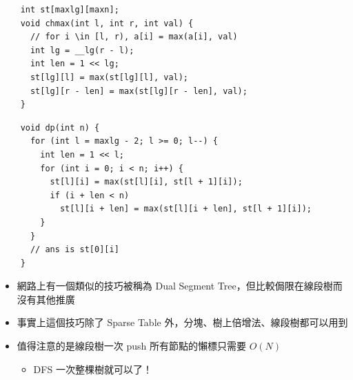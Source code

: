 \documentclass[standalone]{beamer}
\begin{document}
\begin{frame}[fragile]{}
  \begin{verbatim}
    int st[maxlg][maxn];
    void chmax(int l, int r, int val) {
      // for i \in [l, r), a[i] = max(a[i], val)
      int lg = __lg(r - l);
      int len = 1 << lg;
      st[lg][l] = max(st[lg][l], val);
      st[lg][r - len] = max(st[lg][r - len], val);
    }
  \end{verbatim}
\end{frame}

\begin{frame}[fragile]{}
  \begin{verbatim}
    void dp(int n) {
      for (int l = maxlg - 2; l >= 0; l--) {
        int len = 1 << l;
        for (int i = 0; i < n; i++) {
          st[l][i] = max(st[l][i], st[l + 1][i]);
          if (i + len < n)
            st[l][i + len] = max(st[l][i + len], st[l + 1][i]);
        }
      }
      // ans is st[0][i]
    }
  \end{verbatim}
\end{frame}

\begin{frame}[fragile]{}
  \begin{itemize}
    \item 網路上有一個類似的技巧被稱為 Dual Segment Tree，但比較侷限在線段樹而沒有其他推廣
    \item 事實上這個技巧除了 Sparse Table 外，分塊、樹上倍增法、線段樹都可以用到
    \item 值得注意的是線段樹一次 push 所有節點的懶標只需要 $O(N)$
      \begin{itemize}
        \item DFS 一次整棵樹就可以了！
      \end{itemize}
  \end{itemize}
\end{frame}
\end{document}
